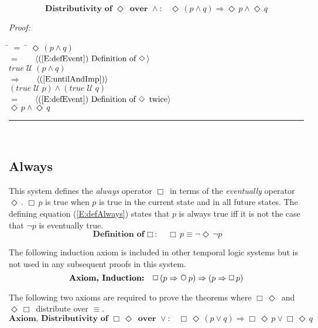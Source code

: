 \documentclass[fleqn, leqno]{article}
\newcommand{\lgap}{2pt}                             %
\newcommand{\mymathindent}{24pt}                    %
\newcommand{\impl}{\ensuremath{\Rightarrow}}        %
\newcommand{\Until}{\;\mathcal{U}\;}
\newcommand{\Next}{\;\,\text{\raisebox{3.5pt}{\circle{6}}}}
\newcommand{\Event}{\Diamond\,}
\newcommand{\Always}{\Box\,}
\newcommand{\myqed}{\hfill\rule[-.23ex]{1.2ex}{2.0ex}}
\newcommand{\Gll} {\langle}                         %
\newcommand{\Ggg} {\rangle}                         %
\newcommand{\Hint}[1]     {\ \ \ $\Gll              \mbox{#1} \Ggg$ }   %
\begin{document}
\begin{equation}\label{E:distEventAnd}
\textbf{Distributivity of $\Event$ over $\land$:}\quad \Event(p \land q) \impl \Event p \land \Event q
\end{equation}

\emph{Proof:}
\begin{tabbing}
\hspace{\mymathindent} \= $= \;$ \= \kill
  \> \>   $\Event(p \land q)$\\[\lgap]
  \> $=$  \>  \Hint{(\ref{E:defEvent}) Definition of $\Event$}\\[\lgap]
  \> \>   $true \Until (p \land q)$\\[\lgap]
  \> $\impl$  \>  \Hint{(\ref{E:untilAndImp})}\\[\lgap]
  \> \>   $(true \Until p) \land (true \Until q)$\\[\lgap]
  \> $=$  \>  \Hint{(\ref{E:defEvent}) Definition of $\Event$ twice}\\[\lgap]
  \> \>   $\Event p \land \Event q$
\end{tabbing}
\myqed\\[\lgap]

\subsection{Always}

This system defines the \textit{always} operator $\Always$ in terms of the \textit{eventually} operator $\Event$.
$\Always p$ is true when $p$ is true in the current state and in all future states.
The defining equation (\ref{E:defAlways}) states that $p$ is always true iff it is not the case that $\neg p$ is eventually true.
\begin{equation}\label{E:defAlways}
\textbf{Definition of $\Always$:}\quad \Always p \equiv \neg\Event\neg p
\end{equation}

The following induction axiom is included in other temporal logic systems but is not used in any subsequent proofs in this system.
\begin{equation}\label{E:induction}
\textbf{Axiom, Induction:}\quad \Always (p \impl \Next p) \impl (p \impl \Always p)
\end{equation}

The following two axioms are required to prove the theorems where $\Always\Event$ and $\Event\Always$ distribute over $\equiv$.
\begin{equation}\label{E:distAlwaysEventOrAx}
\textbf{Axiom, Distributivity of $\Always\Event$ over $\lor$:}\quad \Always\Event(p \lor q) \impl \Always\Event p \lor \Always\Event q
\end{equation}
\end{document}
